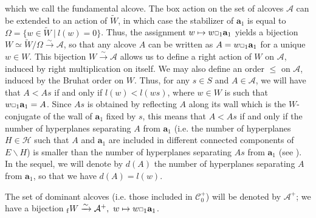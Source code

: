 \documentclass[11pt]{amsart}
\theoremstyle{plain}
\theoremstyle{remark}
\newcommand{\car}{\mbox{\relsize{-5}$\Box$}}
\numberwithin{equation}{section}
\begin{document}
	which we call the fundamental alcove. The box action on the set of alcoves $\mathcal{A}$ can be extended to an action of $\tilde{W}$, in which case the stabilizer of  $\mathbf{a}_1$ is equal to $\Omega=\{w\in \tilde{W}~|~l(w)=0 \}$. Thus, the assignment $w\mapsto w\car_1\mathbf{a}_1$ yields a bijection $W\simeq \tilde{W}/\Omega\xrightarrow{\sim}\mathcal{A}$, so that  any alcove $A$ can be written as $A=w\car_1\mathbf{a}_1$ for a unique $w\in W$. This bijection $W\xrightarrow{\sim} \mathcal{A}$ allows us to define a right action of $W$ on $\mathcal{A}$, induced by right multiplication on itself. We may also define an order $\leq$ on $\mathcal{A}$, induced by the Bruhat order on $W$. Thus, for any $s\in S$ and $A\in \mathcal{A}$, we will have that $A<As$ if and only if $l(w)<l(ws)$, where $w\in W$ is such that $w\car_1\mathbf{a}_1=A$. Since $As$ is obtained by reflecting $A$ along its wall which is the $W$-conjugate of the wall of $\mathbf{a}_1$ fixed by $s$, this means that $A<As$ if and only if the number of hyperplanes separating $A$ from $\mathbf{a}_1$ (i.e. the number of hyperplanes $H\in\mathscr{H}$ such that $A$ and $\mathbf{a}_1$ are included in different connected components of $E\backslash H$) is smaller than the number of hyperplanes separating $As$ from $\mathbf{a}_1$ (see \cite[§1.4]{LUSZTIG1980121}). In the sequel, we will denote by $d(A)$ the number of hyperplanes separating $A$ from $\mathbf{a}_1$, so that we have $d(A)=l(w)$.
	
	The set of dominant alcoves (i.e. those included in $\mathscr{C}^+_0$) will be denoted by $\mathcal{A}^+$; we have a bijection ${_\mathrm{f}W}\xrightarrow{\sim}\mathcal{A}^+,~w\mapsto w\car_1\mathbf{a}_1$.
	
\end{document}
